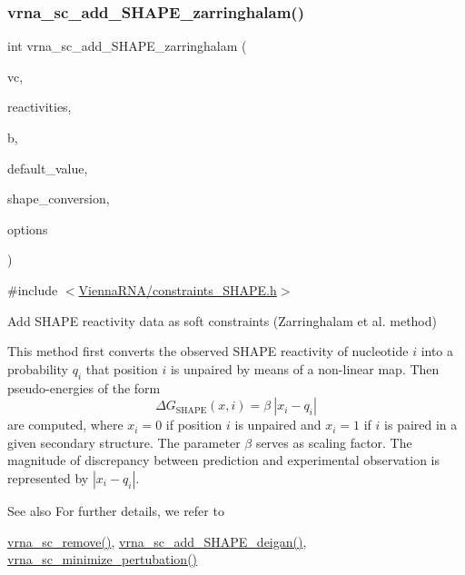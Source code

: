 \subsubsection{\texorpdfstring{vrna\+\_\+sc\+\_\+add\+\_\+\+S\+H\+A\+P\+E\+\_\+zarringhalam()}{vrna\_sc\_add\_SHAPE\_zarringhalam()}}
{\footnotesize\ttfamily int vrna\+\_\+sc\+\_\+add\+\_\+\+S\+H\+A\+P\+E\+\_\+zarringhalam (\begin{DoxyParamCaption}\item[{\mbox{\hyperlink{group__fold__compound_ga1b0cef17fd40466cef5968eaeeff6166}{vrna\+\_\+fold\+\_\+compound\+\_\+t}} $\ast$}]{vc,  }\item[{const double $\ast$}]{reactivities,  }\item[{double}]{b,  }\item[{double}]{default\+\_\+value,  }\item[{const char $\ast$}]{shape\+\_\+conversion,  }\item[{unsigned int}]{options }\end{DoxyParamCaption})}



{\ttfamily \#include $<$\mbox{\hyperlink{constraints__SHAPE_8h}{Vienna\+R\+N\+A/constraints\+\_\+\+S\+H\+A\+P\+E.\+h}}$>$}



Add S\+H\+A\+PE reactivity data as soft constraints (Zarringhalam et al. method) 

This method first converts the observed S\+H\+A\+PE reactivity of nucleotide $ i $ into a probability $ q_i $ that position $ i $ is unpaired by means of a non-\/linear map. Then pseudo-\/energies of the form \[ \Delta G_{\text{SHAPE}}(x,i) = \beta\ |x_i - q_i| \] are computed, where $ x_i=0 $ if position $ i $ is unpaired and $ x_i=1 $ if $ i $ is paired in a given secondary structure. The parameter $ \beta $ serves as scaling factor. The magnitude of discrepancy between prediction and experimental observation is represented by $ |x_i - q_i| $.

\begin{DoxySeeAlso}{See also}
For further details, we refer to \cite{zarringhalam:2012} 

\mbox{\hyperlink{group__soft__constraints_ga73cdc07b9a199c614367bebef0f2c41a}{vrna\+\_\+sc\+\_\+remove()}}, \mbox{\hyperlink{group__SHAPE__reactivities_ga57d612b58e1c61dd6cfcb5a843f8f1b3}{vrna\+\_\+sc\+\_\+add\+\_\+\+S\+H\+A\+P\+E\+\_\+deigan()}}, \mbox{\hyperlink{group__perturbation_gaa124bdc20d88001c38ade590c4bcc3c4}{vrna\+\_\+sc\+\_\+minimize\+\_\+pertubation()}}
\end{DoxySeeAlso}

